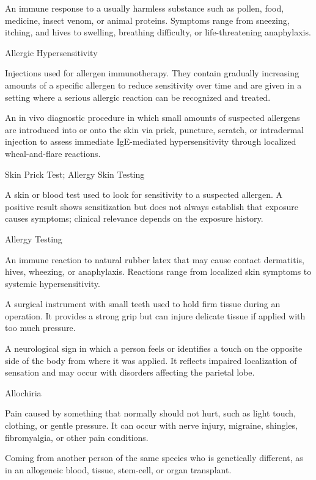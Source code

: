 An immune response to a usually harmless substance such as pollen, food, medicine, insect venom, or animal proteins. Symptoms range from sneezing, itching, and hives to swelling, breathing difficulty, or life-threatening anaphylaxis.

\synonyms
Allergic Hypersensitivity

 Injections used for allergen immunotherapy. They contain gradually increasing amounts of a specific allergen to reduce sensitivity over time and are given in a setting where a serious allergic reaction can be recognized and treated.

 An in vivo diagnostic procedure in which small amounts of suspected allergens are introduced into or onto the skin via prick, puncture, scratch, or intradermal injection to assess immediate IgE-mediated hypersensitivity through localized wheal-and-flare reactions.

\synonyms
Skin Prick Test; Allergy Skin Testing

 A skin or blood test used to look for sensitivity to a suspected allergen. A positive result shows sensitization but does not always establish that exposure causes symptoms; clinical relevance depends on the exposure history.

\synonyms
Allergy Testing

 An immune reaction to natural rubber latex that may cause contact dermatitis, hives, wheezing, or anaphylaxis. Reactions range from localized skin symptoms to systemic hypersensitivity.

 A surgical instrument with small teeth used to hold firm tissue during an operation. It provides a strong grip but can injure delicate tissue if applied with too much pressure.

 A neurological sign in which a person feels or identifies a touch on the opposite side of the body from where it was applied. It reflects impaired localization of sensation and may occur with disorders affecting the parietal lobe.

\synonyms
Allochiria

 Pain caused by something that normally should not hurt, such as light touch, clothing, or gentle pressure. It can occur with nerve injury, migraine, shingles, fibromyalgia, or other pain conditions.

 Coming from another person of the same species who is genetically different, as in an allogeneic blood, tissue, stem-cell, or organ transplant.

